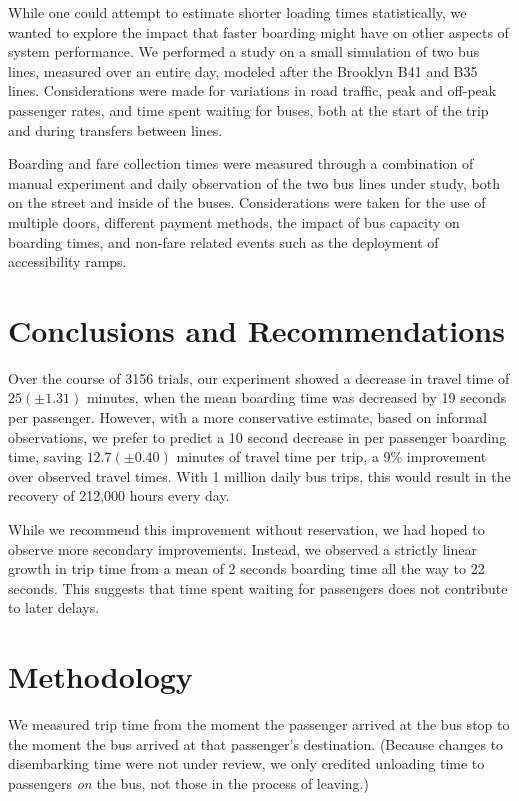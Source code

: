 \documentclass[12pt]{article}
\begin{document}
While one could attempt to estimate shorter loading times statistically, we
wanted to explore the impact that faster boarding might have on other aspects
of system performance. We performed a study on a small simulation of two bus
lines, measured over an entire day, modeled after the Brooklyn B41 and B35
lines. Considerations were made for variations in road traffic, peak and
off-peak passenger rates, and time spent waiting for buses, both at the start
of the trip and during transfers between lines.

Boarding and fare collection times were measured through a combination of
manual experiment and daily observation of the two bus lines under study, both
on the street and inside of the buses. Considerations were taken for the use
of multiple doors, different payment methods, the impact of bus capacity on
boarding times, and non-fare related events such as the deployment of
accessibility ramps.

\section{Conclusions and Recommendations}

Over the course of 3156 trials, our experiment showed a decrease
in travel time of $25 \left(\pm 1.31\right)$ minutes, when the mean boarding
time was decreased by 19 seconds per passenger. However, with a more
conservative estimate, based on informal observations, we prefer to predict a
10 second decrease in per passenger boarding time, saving
$12.7 \left(\pm0.40\right)$ minutes of travel time per trip, a 9\%
improvement over observed travel times. With 1 million daily bus trips, this
would result in the recovery of 212,000 hours every day.

While we recommend this improvement without reservation, we had hoped to
observe more secondary improvements. Instead, we observed a strictly linear
growth in trip time from a mean of 2 seconds boarding time all the way to 22
seconds. This suggests that time spent waiting for passengers does not
contribute to later delays.

\section{Methodology}

We measured trip time from the moment the passenger arrived at the bus stop to
the moment the bus arrived at that passenger's destination. (Because changes
to disembarking time were not under review, we only credited unloading time to
passengers \emph{on} the bus, not those in the process of leaving.)
\end{document}
